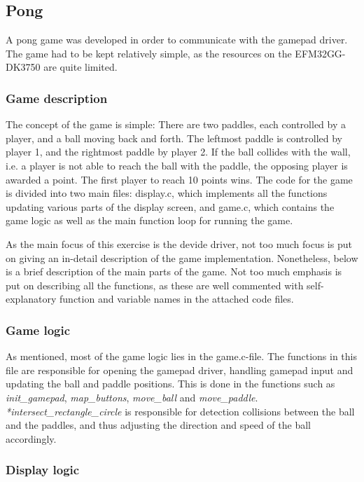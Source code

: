 \subsection{Pong}
A pong game was developed in order to communicate with the gamepad driver. The game had to be kept relatively simple, as the resources on the EFM32GG-DK3750 are quite limited.

\subsubsection{Game description}

The concept of the game is simple: There are two paddles, each controlled by a player, and a ball moving back and forth. The leftmost paddle is controlled by player 1, and the rightmost paddle by player 2. If the ball collides with the wall, i.e. a player is not able to reach the ball with the paddle, the opposing player is awarded a point. The first player to reach 10 points wins. The code for the game is divided into two main files: display.c, which implements all the functions updating various parts of the display screen, and game.c, which contains the game logic as well as the main function loop for running the game.

As the main focus of this exercise is the devide driver, not too much focus is put on giving an in-detail description of the game implementation. Nonetheless, below is a brief description of the main parts of the game. Not too much emphasis is put on describing all the functions, as these are well commented with self-explanatory function and variable names in the attached code files.

\subsubsection{Game logic}

As mentioned, most of the game logic lies in the game.c-file. The functions in this file are responsible for opening the gamepad driver, handling gamepad input and updating the ball and paddle positions. This is done in the functions such as \emph{init_gamepad}, \emph{map_buttons}, \emph{move_ball} and \emph{move_paddle}. \emph{*intersect_rectangle_circle} is responsible for detection collisions between the ball and the paddles, and thus adjusting the direction and speed of the ball accordingly.

\subsubsection{Display logic}

